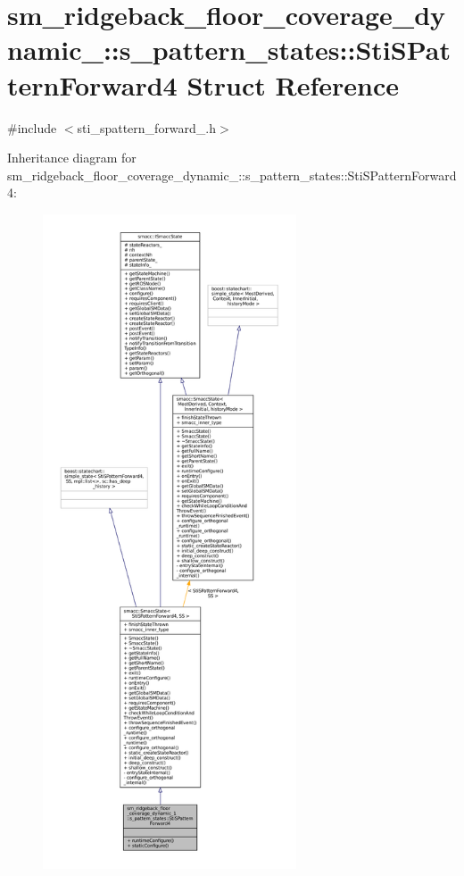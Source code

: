 \hypertarget{structsm__ridgeback__floor__coverage__dynamic__1_1_1s__pattern__states_1_1StiSPatternForward4}{}\section{sm\+\_\+ridgeback\+\_\+floor\+\_\+coverage\+\_\+dynamic\+\_\+:\+:s\+\_\+pattern\+\_\+states\+:\+:Sti\+S\+Pattern\+Forward4 Struct Reference}
\label{structsm__ridgeback__floor__coverage__dynamic__1_1_1s__pattern__states_1_1StiSPatternForward4}


{\ttfamily \#include $<$sti\+\_\+spattern\+\_\+forward\+\_.\+h$>$}



Inheritance diagram for sm\+\_\+ridgeback\+\_\+floor\+\_\+coverage\+\_\+dynamic\+\_\+:\+:s\+\_\+pattern\+\_\+states\+:\+:Sti\+S\+Pattern\+Forward4\+:
\nopagebreak
\begin{figure}[H]
\begin{center}
\leavevmode
\includegraphics[height=550pt]{structsm__ridgeback__floor__coverage__dynamic__1_1_1s__pattern__states_1_1StiSPatternForward4__inherit__graph}
\end{center}
\end{figure}



